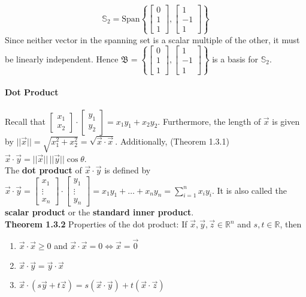 \documentclass[10pt,letter]{article}
\begin{document}
$$\mathbb{S}_2=\text{Span}\left\{\begin{bmatrix}0\\1\\1\end{bmatrix},\begin{bmatrix}1\\-1\\1\end{bmatrix}\right\}$$ Since neither vector in the spanning set is a scalar multiple of the other, it must be linearly independent. Hence $\mathfrak{B} = \left\{\begin{bmatrix}0\\1\\1\end{bmatrix},\begin{bmatrix}1\\-1\\1\end{bmatrix}\right\}$ is a basis for $\mathbb{S}_2$. 

\paragraph{Dot Product} Recall that $\begin{bmatrix}x_1\\x_2\end{bmatrix}\cdot \begin{bmatrix}y_1\\y_2\end{bmatrix} = x_1y_1+x_2y_2$. Furthermore, the length of $\vec{x}$ is given by $||\vec{x}||=\sqrt{x_1^2+x_2^2}=\sqrt{\vec{x}\cdot\vec{x}}$. Additionally, (Theorem 1.3.1) $\vec{x}\cdot\vec{y}=||\vec{x}||\,||\vec{y}||\cos\theta$. \\ 
The \textbf{dot product} of $\vec{x}\cdot\vec{y}$ is defined by $\vec{x}\cdot\vec{y}=\begin{bmatrix}x_1\\\vdots\\x_n\end{bmatrix}\cdot\begin{bmatrix}y_1\\\vdots\\y_n\end{bmatrix}=x_1y_1+\ldots+x_ny_n=\sum_{i=1}^nx_iy_i$. It is also called the \textbf{scalar product} or the \textbf{standard inner product}. \\ 
\textbf{Theorem 1.3.2} Properties of the dot product: If $\vec{x},\vec{y},\vec{z}\in\mathbb{R}^n$ and $s,t\in\mathbb{R}$, then \begin{enumerate}
    \item $\vec{x}\cdot\vec{x}\geq0$ and $\vec{x}\cdot\vec{x}=0\Leftrightarrow \vec{x}=\vec{0}$ 
    \item $\vec{x}\cdot\vec{y}=\vec{y}\cdot\vec{x}$ 
    \item $\vec{x}\cdot(s\vec{y}+t\vec{z})=s(\vec{x}\cdot\vec{y})+t(\vec{x}\cdot\vec{z})$  
\end{enumerate}
\end{document}
